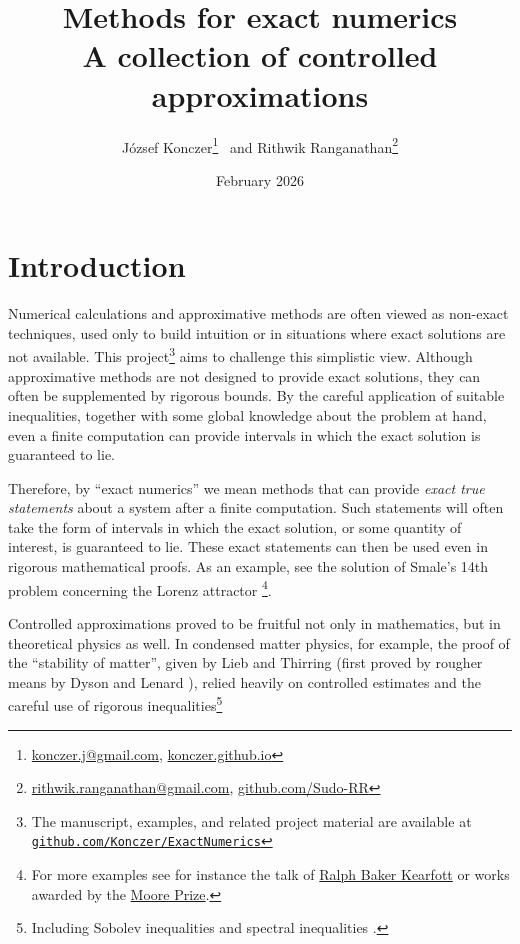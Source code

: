 \documentclass{article}
\title{Methods for exact numerics \\
        \large A collection of controlled approximations}
\author{József Konczer\footnote{\href{mailto:konczer.j@gmail.com}{konczer.j@gmail.com},
        \href{https://konczer.github.io/}{konczer.github.io}} \ and Rithwik Ranganathan\footnote{\href{mailto:rithwik.ranganathan@gmail.com}{rithwik.ranganathan@gmail.com}, \href{https://github.com/Sudo-RR} {github.com/Sudo-RR}}
        }
\date{February 2026}
\theoremstyle{definition}
\begin{document}
\maketitle

\begin{abstract}
    
\end{abstract}

\section{Introduction}

Numerical calculations and approximative methods are often viewed as non-exact techniques, used only to build intuition or in situations where exact solutions are not available. This project\footnote{The manuscript, examples, and related project material are available at
\href{https://github.com/Konczer/ExactNumerics}
{\texttt{github.com/Konczer/ExactNumerics}}}
aims to challenge this simplistic view. Although approximative methods are not designed to provide exact solutions, they can often be supplemented by rigorous bounds. By the careful application of suitable inequalities, together with some global knowledge about the problem at hand, even a finite computation can provide intervals in which the exact solution is guaranteed to lie.

Therefore, by ``exact numerics'' we mean methods that can provide \emph{exact true statements} about a system after a finite computation. Such statements will often take the form of intervals in which the exact solution, or some quantity of interest, is guaranteed to lie. These exact statements can then be used even in rigorous mathematical proofs. As an example, see the solution of Smale's 14th problem concerning the Lorenz attractor \cite{paper:Tucker2002}\footnote{For more examples see for instance the talk of \href{https://www.youtube.com/watch?v=SLHnQuAPLsI}{Ralph Baker Kearfott} or works awarded by the \href{https://en.wikipedia.org/wiki/Ramon_E._Moore}{Moore Prize}.}.

Controlled approximations proved to be fruitful not only in mathematics, but in theoretical physics as well. In condensed matter physics, for example, the proof of the ``stability of matter'', given by Lieb and Thirring \cite{book:Lieb2005,paper:Lieb1975} (first proved by rougher means by Dyson and Lenard \cite{paper:DysonLenard1967,paper:DysonLenard1968}), relied heavily on controlled estimates and the careful use of rigorous inequalities\footnote{Including Sobolev inequalities \cite{book:PDETaylor2023,book:AnalysisLieb2001,book:InequalitiesLieb2012} and spectral inequalities \cite{paper:Laptev2012SpectralInequalities}.}
\end{document}
